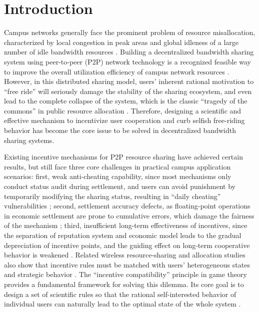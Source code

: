 \documentclass[conference,letterpaper]{IEEEtran}
\begin{document}
\section{Introduction}

Campus networks generally face the prominent problem of resource misallocation, characterized by local congestion in peak areas and global idleness of a large number of idle bandwidth resources \cite{chen2020}. Building a decentralized bandwidth sharing system using peer-to-peer (P2P) network technology is a recognized feasible way to improve the overall utilization efficiency of campus network resources \cite{zhang2007}. However, in this distributed sharing model, users' inherent rational motivation to ``free ride'' will seriously damage the stability of the sharing ecosystem, and even lead to the complete collapse of the system, which is the classic ``tragedy of the commons'' in public resource allocation \cite{wang2019,hardin1968}. Therefore, designing a scientific and effective mechanism to incentivize user cooperation and curb selfish free-riding behavior has become the core issue to be solved in decentralized bandwidth sharing systems.

Existing incentive mechanisms for P2P resource sharing have achieved certain results, but still face three core challenges in practical campus application scenarios: first, weak anti-cheating capability, since most mechanisms only conduct status audit during settlement, and users can avoid punishment by temporarily modifying the sharing status, resulting in ``daily cheating'' vulnerabilities \cite{yang2022}; second, settlement accuracy defects, as floating-point operations in economic settlement are prone to cumulative errors, which damage the fairness of the mechanism \cite{yang2022}; third, insufficient long-term effectiveness of incentives, since the separation of reputation system and economic model leads to the gradual depreciation of incentive points, and the guiding effect on long-term cooperative behavior is weakened \cite{buchegger2002}. Related wireless resource-sharing and allocation studies also show that incentive rules must be matched with users' heterogeneous states and strategic behavior \cite{xu2018,lin2018}. The ``incentive compatibility'' principle in game theory provides a fundamental framework for solving this dilemma. Its core goal is to design a set of scientific rules so that the rational self-interested behavior of individual users can naturally lead to the optimal state of the whole system \cite{li2018,hurwicz1973}.
\end{document}
